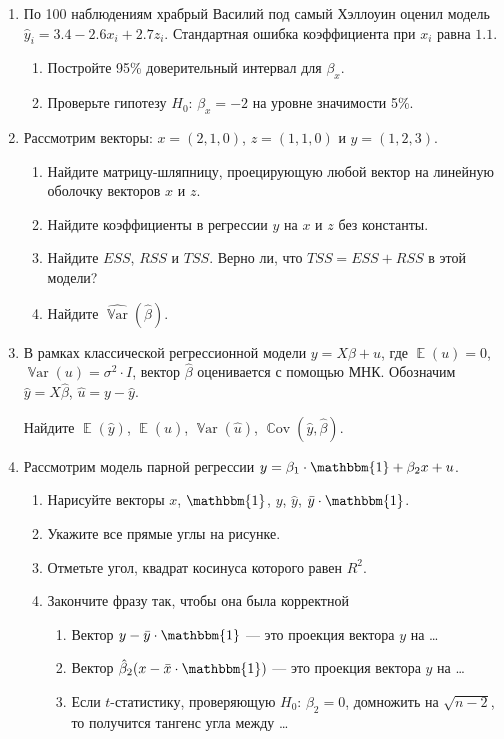 \documentclass[12pt, a4paper]{article}
\DeclareMathOperator{\E}{\mathbb{E}}
\DeclareMathOperator{\Var}{\mathbb{V}ar}
\DeclareMathOperator{\Cov}{\mathbb{C}ov}
\def \hb{\hat{\beta}}
\def \1{\mathbbm{1}}
\def \hy{\hat{y}}
\def \hVar{\widehat{\Var}}
\begin{document}
\begin{enumerate}

\item По 100 наблюдениям храбрый Василий под самый Хэллоуин оценил модель $\hy_i = 3.4 - 2.6 x_i + 2.7 z_i$. Стандартная ошибка коэффициента при $x_i$ равна $1.1$.

  \begin{enumerate}
    \item Постройте 95\% доверительный интервал для $\beta_x$.
    \item Проверьте гипотезу $H_0$: $\beta_x = -2$ на уровне значимости 5\%.
  \end{enumerate}

\item Рассмотрим векторы: $x = (2, 1, 0)$, $z = (1, 1, 0)$ и $y= (1, 2, 3)$.
\begin{enumerate}
  \item Найдите матрицу-шляпницу, проецирующую любой вектор на линейную оболочку векторов $x$ и $z$.
  \item Найдите коэффициенты в регрессии $y$ на $x$ и $z$ без константы.
  \item Найдите $ESS$, $RSS$ и $TSS$. Верно ли, что $TSS=ESS+RSS$ в этой модели?
  \item Найдите $\hVar(\hb)$.
\end{enumerate}



\item В рамках классической регрессионной модели $y=X\beta + u$, где $\E(u)=0$, $\Var(u)=\sigma^2 \cdot I$, вектор $\hb$ оценивается с помощью МНК. Обозначим $\hy=X\hb$, $\hat{u}=y-\hy$.

Найдите $\E(\hy)$, $\E(\hat u)$, $\Var(\hat u)$, $\Cov(\hy, \hb)$.

\item Рассмотрим модель парной регрессии $y = \beta_1 \cdot \1 + \beta_2 x + u$.

\begin{enumerate}
  \item Нарисуйте векторы $x$, $\1$, $y$, $\hy$, $\bar y \cdot \1$.
  \item Укажите все прямые углы на рисунке.
  \item Отметьте угол, квадрат косинуса которого равен $R^2$.
  \item Закончите фразу так, чтобы она была корректной
  \begin{enumerate}
    \item Вектор $y - \bar{y}\cdot \1$ — это проекция вектора $y$ на \ldots
    \item Вектор $\hb_2 (x - \bar x\cdot \1)$ — это проекция вектора $y$ на \ldots
    \item Если $t$-статистику, проверяющую $H_0$: $\beta_2=0$, домножить на $\sqrt{n-2}$, то получится тангенс угла между \ldots
  \end{enumerate}
\end{enumerate}


\end{enumerate}
\end{document}
